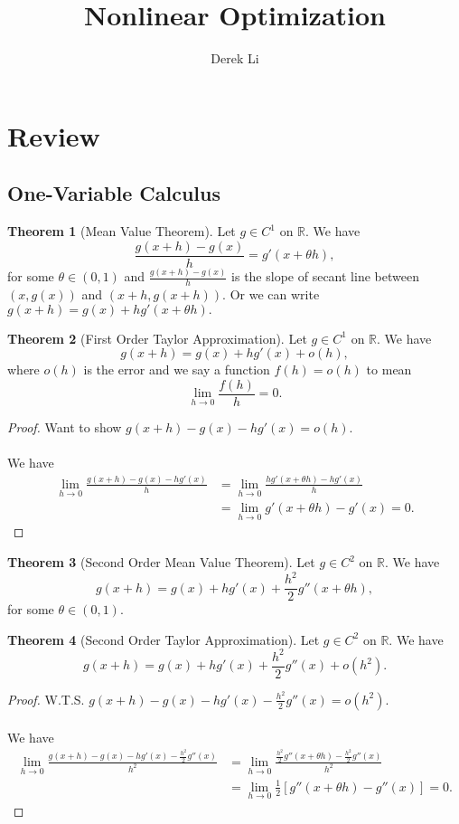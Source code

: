 \documentclass[12pt]{article}
\theoremstyle{definition}
\theoremstyle{definition}
\newtheorem{thm}{Theorem}[section]
\theoremstyle{definition}
\theoremstyle{definition}
\theoremstyle{definition}
\begin{document}
\title{Nonlinear Optimization}
\author{Derek Li}
\date{}
\maketitle

\tableofcontents
\newpage

\section{Review}
\subsection{One-Variable Calculus}
\begin{thm}[Mean Value Theorem]
	Let $g \in C^1$ on $\mathbb{R}.$ We have $$\frac{g(x+h)-g(x)}{h}=g'(x+\theta h),$$ for some $\theta\in(0, 1)$ and $\frac{g(x+h)-g(x)}{h}$ is the slope of secant line between $(x, g(x))$ and $(x+h, g(x+h)).$ Or we can write $g(x+h)=g(x)+hg'(x+\theta h).$
\end{thm}

\begin{thm}[First Order Taylor Approximation]
	Let $g \in C^1$ on $\mathbb{R}.$ We have $$g(x+h)=g(x)+hg'(x)+o(h),$$ where $o(h)$ is the error and we say a function $f(h)=o(h)$ to mean $$\lim_{h\to0}\frac{f(h)}{h}=0.$$
\end{thm}
\begin{proof}
	Want to show $g(x+h)-g(x)-hg'(x)=o(h).$
	\\\\ We have $$\begin{aligned}\lim_{h\to0}\frac{g(x+h)-g(x)-hg'(x)}{h}&=\lim_{h\to0}\frac{hg'(x+\theta h)-hg'(x)}{h}\\&=\lim_{h\to0}g'(x+\theta h)-g'(x)=0.\end{aligned}$$
\end{proof}

\begin{thm}[Second Order Mean Value Theorem]
	Let $g \in C^2$ on $\mathbb{R}.$ We have $$g(x+h)=g(x)+hg'(x)+\frac{h^2}{2}g''(x+\theta h),$$ for some $\theta\in(0, 1).$
\end{thm}

\begin{thm}[Second Order Taylor Approximation]
	Let $g \in C^2$ on $\mathbb{R}.$ We have $$g(x+h)=g(x)+hg'(x)+\frac{h^2}{2}g''(x)+o(h^2).$$
\end{thm}
\begin{proof}
	W.T.S. $g(x+h)-g(x)-hg'(x)-\frac{h^2}{2}g''(x)=o(h^2).$
	\\\\ We have $$\begin{aligned}\lim_{h\to0}\frac{g(x+h)-g(x)-hg'(x)-\frac{h^2}{2}g''(x)}{h^2}&=\lim_{h\to0}\frac{\frac{h^2}{2}g''(x+\theta h)-\frac{h^2}{2}g''(x)}{h^2}\\&=\lim_{h\to0}\frac{1}{2}[g''(x+\theta h)-g''(x)]=0.\end{aligned}$$
\end{proof}
\end{document}
